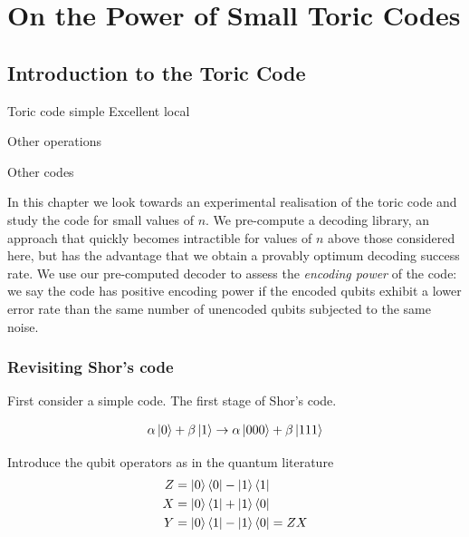 \chapter{On the Power of Small Toric Codes} 
\label{ch:SurfaceCodes}

\section{Introduction to the Toric Code}


Toric code simple
Excellent local 

Other operations

Other codes

In this chapter we look towards an experimental realisation of the toric code and study the code for small values of $n$. We pre-compute a decoding library, an approach that quickly becomes intractible for values of $n$ above those considered here, but has the advantage that we obtain a provably optimum decoding success rate. We use our pre-computed decoder to assess the \textit{encoding power} of the code: we say the code has positive encoding power if the encoded qubits exhibit a lower error rate than the same number of unencoded qubits subjected to the same noise.

\subsection{Revisiting Shor's code}

First consider a simple code. The first stage of Shor's code.

\begin{align}\label{shor_state}
  \alpha\left\vert0\right\rangle + \beta\left\vert1\right\rangle \rightarrow \alpha\left\vert000\right\rangle + \beta\left\vert111\right\rangle
\end{align}

Introduce the qubit operators as in the quantum literature
\begin{align}
  Z &= \left\vert0\right\rangle\left\langle 0\right\vert - \left\vert1\right\rangle\left\langle 1\right\vert \\
  X &= \left\vert0\right\rangle\left\langle 1\right\vert + \left\vert1\right\rangle\left\langle 0\right\vert \\
  Y &= \left\vert0\right\rangle\left\langle 1\right\vert - \left\vert1\right\rangle\left\langle 0\right\vert = ZX
\end{align}

